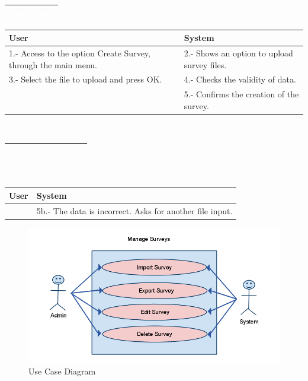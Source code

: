 \begin{tabular}[]{|p{13.8cm}|}\hline
  \rowcolor[rgb]{.3,.4,.9}\textcolor{white}{{\bf Basic Path}} \\\hline
\end{tabular}

\begin{tabular}[]{|p{6.7cm}|p{6.7cm}|}\hline
  \rowcolor[gray]{0.9} User & System \\\hline
  1.- Access to the option Create Survey, through the main menu. & 2.- Shows an option to upload survey files. \\\hline
  3.- Select the file to upload and press OK. & 4.- Checks the validity of data. \\\hline
  & 5.- Confirms the creation of the survey.\\\hline
\end{tabular}\\ 

\begin{tabular}[]{|p{13.8cm}|}\hline
  \rowcolor[rgb]{.3,.4,.9}\textcolor{white}{{\bf Alternative Paths }} \\\hline
\end{tabular}\\ 

\begin{tabular}[]{|p{6.7cm}|p{6.7cm}|}\hline
  \rowcolor[gray]{0.9} User & System \\\hline
  & 5b.- The data is incorrect. Asks for another file input. \\\hline
\end{tabular}

\begin{figure}[h!]
  \begin{center}
   \includegraphics[width=13.6cm]{pics/ManageSurveys.png}
  \end{center}
 \caption{Use Case Diagram}
\end{figure}

